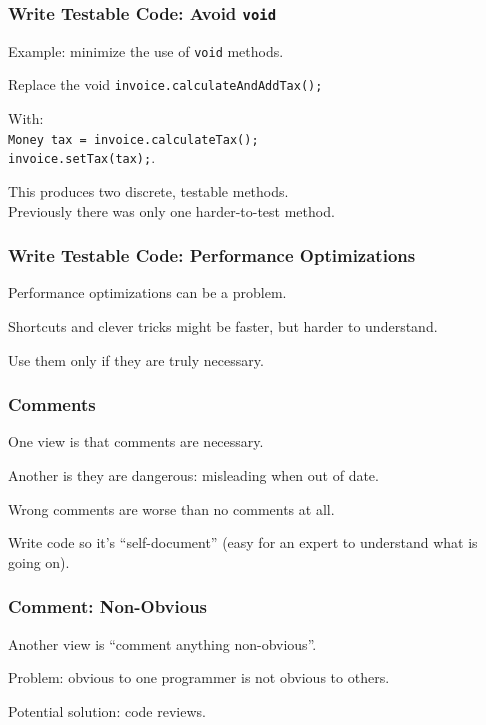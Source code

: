 \begin{frame}
\frametitle{Write Testable Code: Avoid \texttt{void}}
\begin{changemargin}{1cm}
Example: minimize the use of \texttt{void} methods.

Replace the void \texttt{invoice.calculateAndAddTax();}

With: \\
\quad \texttt{Money tax = invoice.calculateTax();} \\
\quad \texttt{invoice.setTax(tax);}. 

This produces two discrete, testable methods.\\
\quad Previously there was only one harder-to-test method.


\end{changemargin}
\end{frame}

\begin{frame}
\frametitle{Write Testable Code: Performance Optimizations}
\begin{changemargin}{1cm}
Performance optimizations can be a problem.

Shortcuts and clever tricks might be faster, but harder to understand.

Use them only if they are truly necessary.

\end{changemargin}
\end{frame}


\begin{frame}
\frametitle{Comments}
\begin{changemargin}{1cm}
One view is that comments are necessary.

Another is they are dangerous: misleading when out of date.

Wrong comments are worse than no comments at all.

Write code so it's ``self-document'' (easy for an expert to understand what is going on).

\end{changemargin}
\end{frame}

\begin{frame}
\frametitle{Comment: Non-Obvious}
\begin{changemargin}{1cm}
Another view is ``comment anything non-obvious''.

Problem: obvious to one programmer is not obvious to others. 

Potential solution: code reviews. 

\end{changemargin}
\end{frame}

